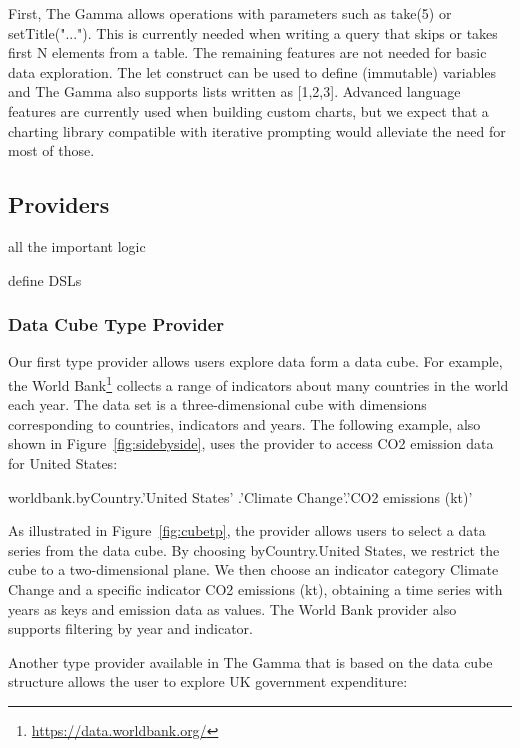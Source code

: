 \documentclass[manuscript,review,anonymous]{acmart}
\newcommand{\ikvd}[1]{{\fontfamily{zi4}\selectfont\small #1}}
\begin{document}
\noindent
First, The Gamma allows operations with parameters such as \ikvd{take(5)} or \ikvd{setTitle("...")}.
This is currently needed when writing a query that skips or takes first N elements from a table.
The remaining features are not needed for basic data exploration. The \ikvd{let} construct can be
used to define (immutable) variables and The Gamma also supports lists written as \ikvd{[1,2,3]}.
Advanced language features are currently used when building custom charts, but we expect that a
charting library compatible with iterative prompting would alleviate the need for most of those.


\subsection{Providers}
\label{sec:overview-tps}

all the important logic

define DSLs

\subsubsection*{Data Cube Type Provider}
Our first type provider allows users explore data form a data cube. For example, the World
Bank\footnote{\url{https://data.worldbank.org/}} collects a range of indicators about many
countries in the world each year. The data set is a three-dimensional cube with dimensions
corresponding to countries, indicators and years. The following example, also shown in
Figure~\ref{fig:sidebyside}, uses the provider to access CO2 emission data for United States:

\begin{thegamma}
worldbank.byCountry.'United States'
  .'Climate Change'.'CO2 emissions (kt)'
\end{thegamma}

As illustrated in Figure~\ref{fig:cubetp}, the provider allows users to select a data series
from the data cube. By choosing \ikvd{byCountry.\textquotesingle United States\textquotesingle},
we restrict the cube to a two-dimensional plane. We then choose an indicator category
\ikvd{\textquotesingle Climate Change\textquotesingle} and a specific indicator
\ikvd{\textquotesingle CO2 emissions (kt)\textquotesingle}, obtaining a time series with
years as keys and emission data as values. The World Bank provider also supports filtering
by year and indicator.

Another type provider available in The Gamma that is based on the data cube structure allows
the user to explore UK government expenditure:
\end{document}
